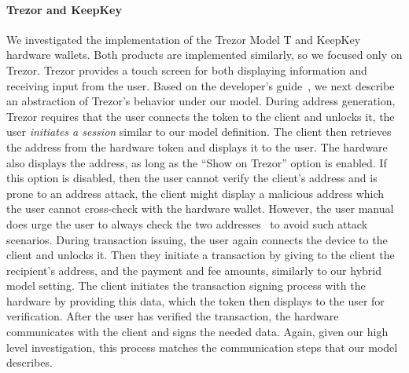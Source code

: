 \paragraph{Trezor and KeepKey}
We investigated the implementation of the Trezor Model T and KeepKey hardware
wallets. Both products are implemented similarly, so we focused only on Trezor.
Trezor provides a touch screen for both displaying information and receiving
input from the user. Based on the developer's guide~\cite{trezor-dev}, we next
describe an abstraction of Trezor's behavior under our model.
During address generation, Trezor requires that the user connects the token to
the client and unlocks it, \ie the user \emph{initiates a session} similar to
our model definition. The client then retrieves the address from the hardware
token and displays it to the user. The hardware also displays the address, as
long as the ``Show on Trezor'' option is enabled. If this option is disabled,
then the user cannot verify the client's address and is prone to an address
attack, \ie the client might display a malicious address which the user cannot
cross-check with the hardware wallet. However, the user manual does urge the
user to always check the two addresses~\cite{trezor-user} to avoid such attack
scenarios.
During transaction issuing, the user again connects the device to the client
and unlocks it. Then they initiate a transaction by giving to the client the
recipient's address, and the payment and fee amounts, similarly to our hybrid
model setting. The client initiates the transaction signing process with the
hardware by providing this data, which the token then displays to the user for
verification. After the user has verified the transaction, the hardware
communicates with the client and signs the needed data. Again, given our high
level investigation, this process matches the communication steps that our
model describes.

